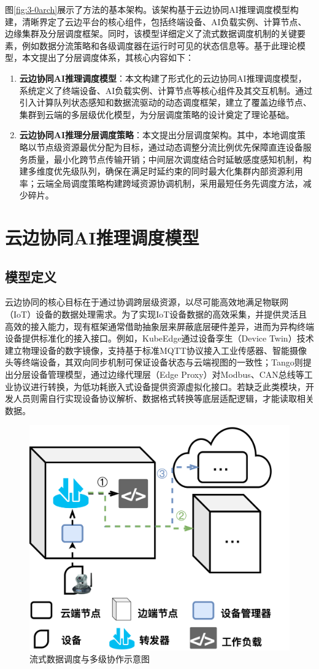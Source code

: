 图\ref{fig:3-0arch}展示了方法的基本架构。该架构基于云边协同AI推理调度模型构建，清晰界定了云边平台的核心组件，包括终端设备、AI负载实例、计算节点、边缘集群及分层调度框架。同时，该模型详细定义了流式数据调度机制的关键要素，例如数据分流策略和各级调度器在运行时可见的状态信息等。基于此理论模型，本文提出了分层调度体系，其核心内容如下：

\begin{enumerate}
    \item \textbf{云边协同AI推理调度模型}：本文构建了形式化的云边协同AI推理调度模型，系统定义了终端设备、AI负载实例、计算节点等核心组件及其交互机制。通过引入计算队列状态感知和数据流驱动的动态调度框架，建立了覆盖边缘节点、集群到云端的多层级优化模型，为分层调度策略的设计奠定了理论基础。
    \item \textbf{云边协同AI推理分层调度策略}：本文提出分层调度架构。其中，本地调度策略以节点级资源最优分配为目标，通过动态调整分流比例优先保障直连设备服务质量，最小化跨节点传输开销；中间层次调度结合时延敏感度感知机制，构建多维度优先级队列，确保在满足时延约束的同时最大化集群内部资源利用率；云端全局调度策略构建跨域资源协调机制，采用最短任务先调度方法，减少碎片。
\end{enumerate}

\section{云边协同AI推理调度模型}

\subsection{模型定义}

云边协同的核心目标在于通过协调跨层级资源，以尽可能高效地满足物联网（IoT）设备的数据处理需求。为了实现IoT设备数据的高效采集，并提供灵活且高效的接入能力，现有框架通常借助抽象层来屏蔽底层硬件差异，进而为异构终端设备提供标准化的接入接口。例如，KubeEdge\cite{xiong2018extend}通过设备孪生（Device Twin）技术建立物理设备的数字镜像，支持基于标准MQTT协议接入工业传感器、智能摄像头等终端设备，其双向同步机制可保证设备状态与云端视图的一致性；Tango\cite{bagchi2017tango}则提出分层设备管理模型，通过边缘代理层（Edge Proxy）对Modbus、CAN总线等工业协议进行转换，为低功耗嵌入式设备提供资源虚拟化接口。若缺乏此类模块，开发人员则需自行实现设备协议解析、数据格式转换等底层适配逻辑，才能读取相关数据。

\begin{figure}[ht]
  \centering
  \includegraphics[width=0.5\linewidth]{pics/3-1流处理.png}
  \caption{流式数据调度与多级协作示意图}
  \label{fig:3-1flow}
\end{figure}

